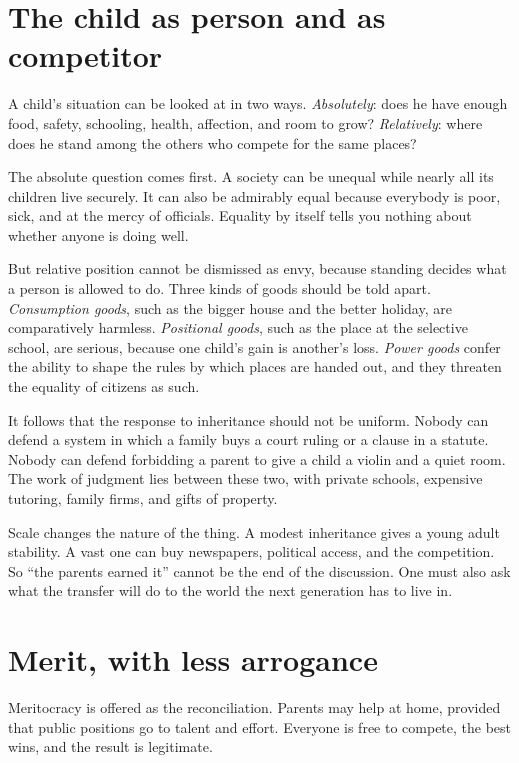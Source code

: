 \documentclass[12pt,a4paper]{book}
\begin{document}
\section{The child as person and as competitor}

A child's situation can be looked at in two ways. \emph{Absolutely}: does he have enough food, safety, schooling, health, affection, and room to grow? \emph{Relatively}: where does he stand among the others who compete for the same places?

The absolute question comes first. A society can be unequal while nearly all its children live securely. It can also be admirably equal because everybody is poor, sick, and at the mercy of officials. Equality by itself tells you nothing about whether anyone is doing well.

But relative position cannot be dismissed as envy, because standing decides what a person is allowed to do. Three kinds of goods should be told apart. \emph{Consumption goods}, such as the bigger house and the better holiday, are comparatively harmless. \emph{Positional goods}, such as the place at the selective school, are serious, because one child's gain is another's loss. \emph{Power goods} confer the ability to shape the rules by which places are handed out, and they threaten the equality of citizens as such.

It follows that the response to inheritance should not be uniform. Nobody can defend a system in which a family buys a court ruling or a clause in a statute. Nobody can defend forbidding a parent to give a child a violin and a quiet room. The work of judgment lies between these two, with private schools, expensive tutoring, family firms, and gifts of property.

Scale changes the nature of the thing. A modest inheritance gives a young adult stability. A vast one can buy newspapers, political access, and the competition. So ``the parents earned it'' cannot be the end of the discussion. One must also ask what the transfer will do to the world the next generation has to live in.

\section{Merit, with less arrogance}

Meritocracy is offered as the reconciliation. Parents may help at home, provided that public positions go to talent and effort. Everyone is free to compete, the best wins, and the result is legitimate.
\end{document}
